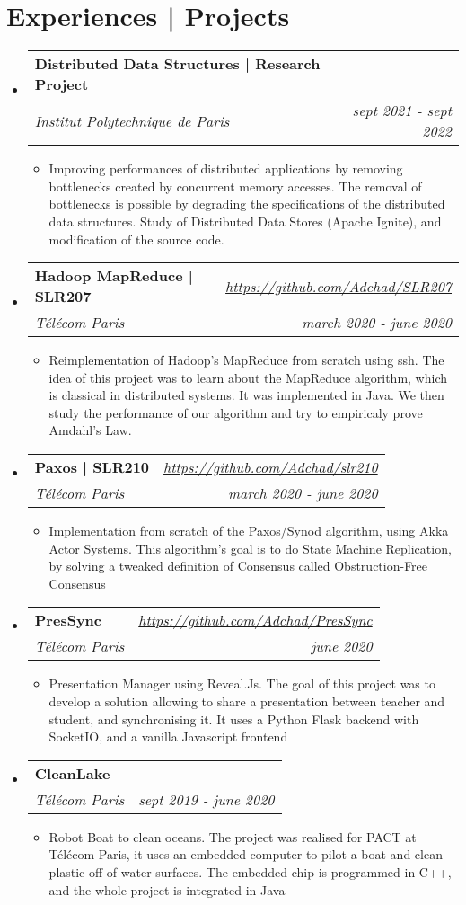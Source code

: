 \documentclass[a4paper,20pt]{article}
\makeatletter
\newcommand{\resumeItemWithoutTitle}[1]{
  \item\small{
    {\vspace{-2pt}#1}
  }
}
\newcommand{\resumeSubheading}[4]{
  \vspace{-1pt}\item
    \begin{tabular*}{0.97\textwidth}{l@{\extracolsep{\fill}}r}
      \textbf{#1} & #2 \\
      \textit{#3} & \textit{#4} \\
    \end{tabular*}\vspace{-5pt}
}
\newcommand{\resumeSubHeadingListStart}{\begin{itemize}[leftmargin=*]}
\newcommand{\resumeSubHeadingListEnd}{\end{itemize}}
\newcommand{\resumeItemListStart}{\begin{itemize}}
\newcommand{\resumeItemListEnd}{\end{itemize}\vspace{-5pt}}
\makeatother
\begin{document}
\section{Experiences | Projects}
 \resumeSubHeadingListStart
  \resumeSubheading
  {Distributed Data Structures | Research Project}{ }
  {Institut Polytechnique de Paris}{sept 2021 - sept 2022}
   \resumeItemListStart 
    \resumeItemWithoutTitle
    {Improving performances of distributed applications by removing bottlenecks created by concurrent memory accesses. The removal of bottlenecks is possible by degrading the specifications of the distributed data structures. Study of Distributed Data Stores (Apache Ignite), and modification of the source code. }
   \resumeItemListEnd 
  \resumeSubheading
  {Hadoop MapReduce | SLR207}{\textit{\href{https://github.com/Adchad/SLR207}{https://github.com/Adchad/SLR207}}}
  {Télécom Paris}{march 2020 - june 2020 }
   \resumeItemListStart 
    \resumeItemWithoutTitle
    {Reimplementation of Hadoop's MapReduce from scratch using ssh. The idea of this project was to learn about the MapReduce algorithm, which is classical in distributed systems. It was implemented in Java. We then study the performance of our algorithm and try to empiricaly prove Amdahl's Law. }
   \resumeItemListEnd 
  \resumeSubheading
  {Paxos | SLR210}{\textit{\href{https://github.com/Adchad/slr210}{https://github.com/Adchad/slr210}}}
  {Télécom Paris}{march 2020 - june 2020 }
   \resumeItemListStart 
    \resumeItemWithoutTitle
    {Implementation from scratch of the Paxos/Synod algorithm, using Akka Actor Systems. This algorithm's goal is to do State Machine Replication, by solving a tweaked definition of Consensus called Obstruction-Free Consensus}
   \resumeItemListEnd 
  \resumeSubheading
  {PresSync}{\textit{\href{https://github.com/Adchad/PresSync}{https://github.com/Adchad/PresSync}}}
  {Télécom Paris}{june 2020}
   \resumeItemListStart 
    \resumeItemWithoutTitle
    {Presentation Manager using Reveal.Js. The goal of this project was to develop a solution allowing to share a presentation between teacher and student, and synchronising it. It uses a Python Flask backend with SocketIO, and a vanilla Javascript frontend}
   \resumeItemListEnd 
  \resumeSubheading
  {CleanLake}{ }
  {Télécom Paris}{sept 2019 - june 2020}
   \resumeItemListStart 
    \resumeItemWithoutTitle
    {Robot Boat to clean oceans. The project was realised for PACT at Télécom Paris, it uses an embedded computer to pilot a boat and clean plastic off of water surfaces. The embedded chip is programmed in C++, and the whole project is integrated in Java}
   \resumeItemListEnd 
 \resumeSubHeadingListEnd
\end{document}
